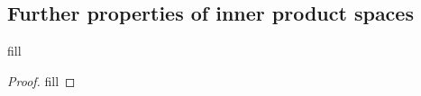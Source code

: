 \subsection{Further properties of inner product spaces}

\begin{exercise}{1}
fill
\end{exercise}
\begin{proof}
fill
\end{proof}